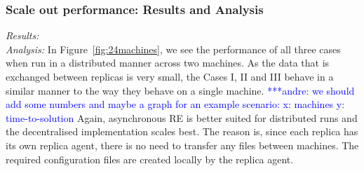 \documentclass{rspublic}
\newcommand{\alnote}[1]{ {\textcolor{blue} { ***andre: #1 }}}
\newcommand{\athotanote}[1]{ {\textcolor{green} { ***athota: #1 }}}
\newcommand{\alnote}[1]{}
\newcommand{\athotanote}[1]{}
\begin{document}
\subsubsection{Scale out performance: Results and Analysis}

{\it Results:}\\


{\it Analysis: } In Figure~\ref{fig:24machines}, we see the performance
of all three cases when run in a distributed manner across two
machines. As the data that is exchanged between replicas is very
small, the Cases I, II and III behave in a similar manner to the way
they behave on a single machine. \alnote{we should add some numbers
  and maybe a graph for an example scenario: x: machines y:
  time-to-solution} Again, asynchronous RE is better suited for
distributed runs and the decentralised implementation scales best. The
reason is, since each replica has its own replica agent, there is no
need to transfer any files between machines. The required
configuration files are created locally by the replica agent.


\end{document}
